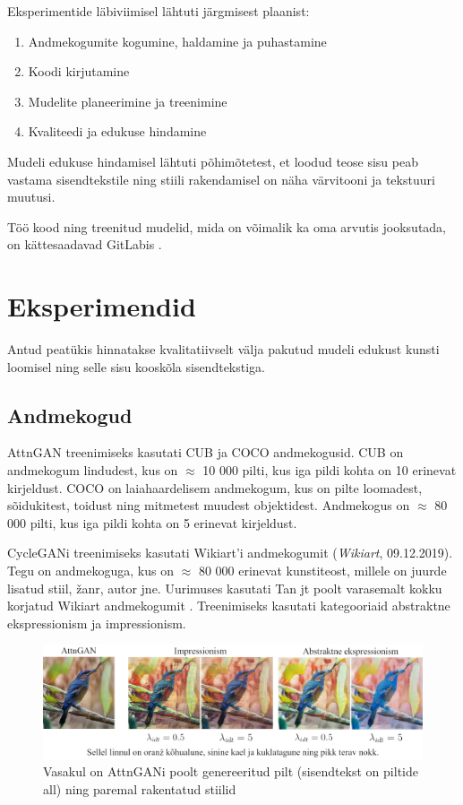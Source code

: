 \documentclass{vilgym}
\begin{document}
	Eksperimentide läbiviimisel lähtuti järgmisest plaanist:
	\begin{enumerate}
		\item Andmekogumite kogumine, haldamine ja puhastamine
		\item Koodi kirjutamine 
		\item Mudelite planeerimine ja treenimine
		\item Kvaliteedi ja edukuse hindamine
	\end{enumerate}

	Mudeli edukuse hindamisel lähtuti põhimõtetest, et loodud teose sisu peab vastama sisendtekstile ning stiili rakendamisel on näha värvitooni ja tekstuuri muutusi.

	Töö kood ning treenitud mudelid, mida on võimalik ka oma arvutis jooksutada, on kättesaadavad GitLabis \parencite{text2art-gan}.

	\section{Eksperimendid}
	
	Antud peatükis hinnatakse kvalitatiivselt välja pakutud mudeli edukust kunsti loomisel ning selle sisu kooskõla sisendtekstiga. 

	\subsection{Andmekogud}
	AttnGAN treenimiseks kasutati CUB \parencite{cub} ja COCO \parencite{srgan} andmekogusid. CUB on andmekogum lindudest, kus on $\approx$ 10 000 pilti, kus iga pildi kohta on 10 erinevat kirjeldust. COCO on laiahaardelisem andmekogum, kus on pilte loomadest, sõidukitest, toidust ning mitmetest muudest objektidest. Andmekogus on $\approx$ 80 000 pilti, kus iga pildi kohta on 5 erinevat kirjeldust.

	CycleGANi treenimiseks kasutati Wikiart'i andmekogumit (\textit{Wikiart}, 09.12.2019). Tegu on andmekoguga, kus on $\approx$ 80 000 erinevat kunstiteost, millele on juurde lisatud stiil, žanr, autor jne. Uurimuses kasutati Tan jt poolt varasemalt kokku korjatud Wikiart andmekogumit \parencite{artgan}. Treenimiseks kasutati kategooriaid abstraktne ekspressionism ja impressionism.

	\begin{figure}
		\includegraphics[width=\linewidth]{images/linnud.jpg}
		\caption{Vasakul on AttnGANi poolt genereeritud pilt (sisendtekst on piltide all) ning paremal rakentatud stiilid}
		\label{fig:cub}
	\end{figure}
\end{document}
